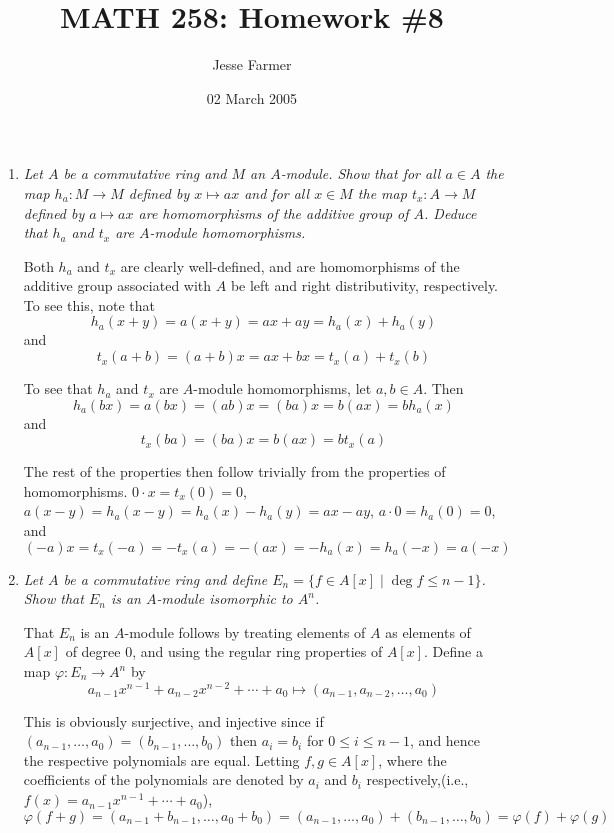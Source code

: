 \documentclass[10pt]{article}
\title{MATH 258: Homework \#8}
\author{Jesse Farmer}
\date{02 March 2005}
\begin{document}
\maketitle
\begin{enumerate}

\item \emph{Let $A$ be a commutative ring and $M$ an $A$-module.  Show that for all $a \in A$ the map $h_a: M \rightarrow M$ defined by $x \mapsto ax$ and for all $x \in M$ the map $t_x: A \rightarrow M$ defined by $a \mapsto ax$ are homomorphisms of the additive group of $A$.  Deduce that $h_a$ and $t_x$ are $A$-module homomorphisms.}

Both $h_a$ and $t_x$ are clearly well-defined, and are homomorphisms of the additive group associated with $A$ be left and right distributivity, respectively.  To see this, note that
$$h_a(x+y) = a(x+y) = ax + ay = h_a(x) + h_a(y)$$ and $$t_x(a + b) = (a+b)x = ax + bx = t_x(a) + t_x(b)$$

To see that $h_a$ and $t_x$ are $A$-module homomorphisms, let $a,b \in A$.  Then $$h_a(bx) = a(bx) = (ab)x = (ba)x = b(ax) = bh_a(x)$$ and $$t_x(ba) = (ba)x = b(ax) = bt_x(a)$$

The rest of the properties then follow trivially from the properties of homomorphisms.  $0 \cdot x = t_x(0) = 0$, $a(x-y) = h_a(x-y) = h_a(x) - h_a(y) = ax - ay$, $a \cdot 0 = h_a(0) = 0$, and $$(-a)x = t_x(-a) = -t_x(a) = -(ax) = -h_a(x) = h_a(-x) = a(-x)$$

\item \emph{Let $A$ be a commutative ring and define $E_n = \{ f \in A[x] \mid \deg f \leq n-1 \}$.  Show that $E_n$ is an $A$-module isomorphic to $A^n$.}

That $E_n$ is an $A$-module follows by treating elements of $A$ as elements of $A[x]$ of degree $0$, and using the regular ring properties of $A[x]$.  Define a map $\varphi: E_n \rightarrow A^n$ by $$a_{n-1}x^{n-1} + a_{n-2}x^{n-2} + \cdots + a_0 \mapsto (a_{n-1}, a_{n-2}, \ldots, a_0)$$

This is obviously surjective, and injective since if $(a_{n-1}, \ldots, a_0) = (b_{n-1}, \ldots, b_0)$ then $a_i = b_i$ for $0 \leq i \leq n-1$, and hence the respective polynomials are equal.  Letting $f,g \in A[x]$, where the coefficients of the polynomials are denoted by $a_i$ and $b_i$ respectively,(i.e., $f(x) = a_{n-1}x^{n-1} + \cdots + a_0$),
\[
\varphi(f+g) = (a_{n-1} + b_{n-1}, \ldots, a_0 + b_0) = (a_{n-1}, \ldots, a_0) + (b_{n-1}, \ldots, b_0) = \varphi(f) + \varphi(g)
\]


\end{enumerate}
\end{document}
